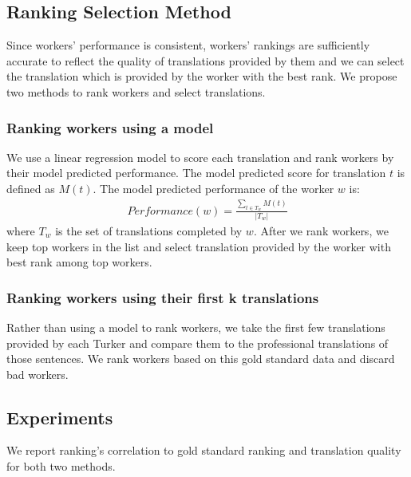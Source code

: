 \documentclass[11pt,letterpaper]{article}
\begin{document}
\subsection{Ranking Selection Method}
Since workers' performance is consistent, workers' rankings are sufficiently accurate to reflect the quality of translations provided by them and we can select the translation which is provided by the worker with the best rank. 
We propose two methods to rank workers and select translations. 
\subsubsection{Ranking workers using a model}
We use a linear regression model to score each translation and rank workers by their model predicted performance.  
The model predicted score for translation $t$ is defined as $M(t)$. The model predicted performance of the worker $w$ is:
\begin{align*}
Performance(w) = \frac{\sum_{t \in T_{w}} M (t)}{|T_{w}|}
 \end{align*}
 where $T_{w} $ is the set of translations completed by $w$. 
After we rank workers, we keep top workers in the list and select translation provided by the worker with best rank among top workers.
\subsubsection{Ranking workers using their first k translations}
Rather than using a model to rank workers, we take the first few translations provided by each Turker  and compare them to the professional translations of those sentences. We rank workers based on this gold standard data and discard bad workers.
\subsection{Experiments}
We report ranking's correlation to gold standard ranking and translation quality for both two methods.
\end{document}
